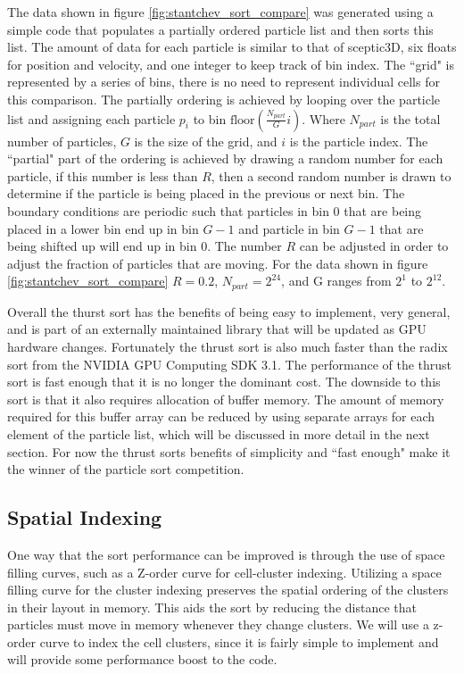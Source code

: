 The data shown in figure \ref{fig:stantchev_sort_compare} was generated using a simple code that populates a partially ordered particle list and then sorts this list. The amount of data for each particle is similar to that of sceptic3D, six floats for position and velocity, and one integer to keep track of bin index. The ``grid" is represented by a series of bins, there is no need to represent individual cells for this comparison. The partially ordering is achieved by looping over the particle list and assigning each particle $p_i$ to bin $\mathrm{floor}(\frac{N_{part}}{G} i)$. Where $N_{part}$ is the total number of particles, $G$ is the size of the grid, and $i$ is the particle index. The ``partial" part of the ordering is achieved by drawing a random number for each particle, if this number is less than $R$, then a second random number is drawn to determine if the particle is being placed in the previous or next bin. The boundary conditions are periodic such that particles in bin 0 that are being placed in a lower bin end up in bin $G-1$ and particle in bin $G-1$ that are being shifted up will end up in bin 0. The number $R$ can be adjusted in order to adjust the fraction of particles that are moving. For the data shown in figure \ref{fig:stantchev_sort_compare} $R = 0.2$, $N_{part} = 2^{24}$, and G ranges from $2^1$ to $2^{12}$. 

Overall the thurst sort has the benefits of being easy to implement, very general, and is part of an externally maintained library that will be updated as GPU hardware changes. Fortunately the thrust sort is also much faster than the radix sort from the NVIDIA GPU Computing SDK 3.1. The performance of the thrust sort is fast enough that it is no longer the dominant cost. The downside to this sort is that it also requires allocation of buffer memory. The amount of memory required for this buffer array can be reduced by using separate arrays for each element of the particle list, which will be discussed in more detail in the next section. For now the thrust sorts benefits of simplicity and ``fast enough" make it the winner of the particle sort competition. 

\subsection{Spatial Indexing}

One way that the sort performance can be improved is through the use of space filling curves, such as a Z-order curve for cell-cluster indexing. Utilizing a space filling curve for the cluster indexing preserves the spatial ordering of the clusters in their layout in memory. This aids the sort by reducing the distance that particles must move in memory whenever they change clusters. We will use a z-order curve to index the cell clusters, since it is fairly simple to implement and will provide some performance boost to the code.

